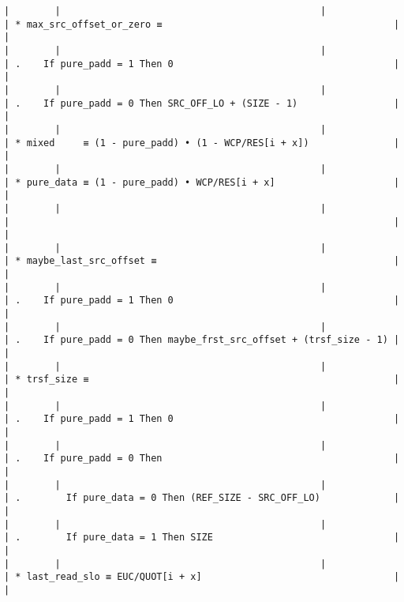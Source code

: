 \documentclass[varwidth=\maxdimen,margin=0.5cm,multi={verbatim}]{standalone}
\begin{document}
\begin{verbatim}
|        |                                              |                                  | * max_src_offset_or_zero ≡                                         |                     |
|        |                                              |                                  | .    If pure_padd = 1 Then 0                                       |                     |
|        |                                              |                                  | .    If pure_padd = 0 Then SRC_OFF_LO + (SIZE - 1)                 |                     |
|        |                                              |                                  | * mixed     ≡ (1 - pure_padd) • (1 - WCP/RES[i + x])               |                     |
|        |                                              |                                  | * pure_data ≡ (1 - pure_padd) • WCP/RES[i + x]                     |                     |
|        |                                              |                                  |                                                                    |                     |
|        |                                              |                                  | * maybe_last_src_offset ≡                                          |                     |
|        |                                              |                                  | .    If pure_padd = 1 Then 0                                       |                     |
|        |                                              |                                  | .    If pure_padd = 0 Then maybe_frst_src_offset + (trsf_size - 1) |                     |
|        |                                              |                                  | * trsf_size ≡                                                      |                     |
|        |                                              |                                  | .    If pure_padd = 1 Then 0                                       |                     |
|        |                                              |                                  | .    If pure_padd = 0 Then                                         |                     |
|        |                                              |                                  | .        If pure_data = 0 Then (REF_SIZE - SRC_OFF_LO)             |                     |
|        |                                              |                                  | .        If pure_data = 1 Then SIZE                                |                     |
|        |                                              |                                  | * last_read_slo ≡ EUC/QUOT[i + x]                                  |                     |

\end{verbatim}
\end{document}
